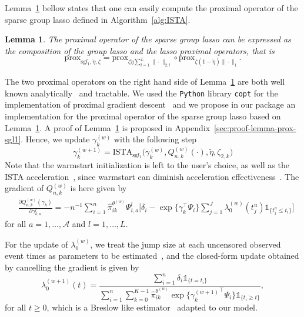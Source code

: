 \documentclass[11pt]{article}
\newtheorem{lemma}{Lemma}
\newcommand{\ind}[1]{\mathds{1}_{#1}}
\newcommand{\norm}[1]{\|#1\|}
\begin{document}
\vspace{.5cm}
Lemma~\ref{lemma:prox-sgl1} bellow states that one can easily compute the proximal operator of the sparse group lasso defined in Algorithm~\ref{alg:ISTA}.
\begin{lemma}
\label{lemma:prox-sgl1}
The proximal operator of the sparse group lasso can be expressed as the composition of the group lasso and the lasso proximal operators, that is
\normalfont
\begin{equation*}
  \text{prox}_{\text{sg} l_1,\tilde \eta, \zeta} = \text{prox}_{\zeta \tilde \eta \sum_{l=1}^L \norm{\cdot}_{2,l}} \circ \text{prox}_{\zeta (1 - \tilde \eta) \norm{\cdot}_1}.
\end{equation*}
\end{lemma}
The two proximal operators on the right hand side of Lemma~\ref{lemma:prox-sgl1} are both well known analytically~\citep{bach2011optimization} and tractable. We used the \texttt{Python} library \texttt{copt} for the implementation of proximal gradient descent~\citep{copt} and we propose in our package an implementation for the proximal operator of the sparse group lasso based on Lemma~\ref{lemma:prox-sgl1}.
A proof of Lemma~\ref{lemma:prox-sgl1} is proposed in Appendix~\ref{sec:proof-lemma-prox-sgl1}.
Hence, we update $\gamma_k^{(w)}$ with the following step
\begin{equation}
  \label{eq:gamma-update}
  \gamma_k^{(w+1)} = \text{ISTA}_{\text{sg} l_1}\big(\gamma_k^{(w)}, Q^{(w)}_{n,k}(\cdot), \tilde \eta, \zeta_{2,k}\big)
\end{equation}
Note that the warmstart initialization is left to the user's choice, as well as the ISTA acceleration~\citep{beck2009fast}, since warmstart can diminish acceleration effectiveness~\citep{tibshirani2010proximal}. The gradient of $Q_{n,k}^{(w)}$ is here given by
\begin{align}
  \label{eq:grad-Q}
  &\frac{\partial Q_{n,k}^{(w)}(\gamma_k)}{\partial \gamma_{k,a}^l} = -n^{-1} \sum_{i=1}^n \hat \pi_{ik}^{\theta^{(w)}} \Psi_{i, a}^l  \Big[ \delta_i - \exp \big\{\gamma_k^\top \Psi_i\big\} \sum_{j=1}^J \lambda_0^{(w)}(t_j^u) \ind{\{t_j^u \leq t_i\}} \Big]
\end{align}
for all $a = 1, \ldots, \mathcal{A}$ and $l = 1, \ldots, L$.

For the update of $\lambda_0^{(w)}$, we treat the jump size at each uncensored observed event times as parameters to be estimated~\citep{klein1992semiparametric}, and the closed-form update obtained by cancelling the gradient is given by
\begin{equation}
  \label{eq:update_lambda_0}
  \lambda_0^{(w+1)}(t)= \dfrac{\sum_{i=1}^n \delta_i \ind{\{t=t_i\}}}{\sum_{i=1}^n \sum_{k=0}^{K-1} \hat \pi_{ik}^{\theta^{(w)}} \exp \big\{{\gamma_k^{(w+1)}}^\top \Psi_i\big\} \ind{\{t_i \geq t\}} },
\end{equation}
for all $t \geq 0$, which is a Breslow like estimator~\citep{breslow1972contribution} adapted to our model. 
\end{document}
